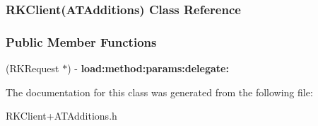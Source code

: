 \hypertarget{interface_r_k_client_07_a_t_additions_08}{
\subsubsection{RKClient(ATAdditions) Class Reference}
\label{interface_r_k_client_07_a_t_additions_08}
}
\subsubsection*{Public Member Functions}
\begin{DoxyCompactItemize}
\item 
\hypertarget{interface_r_k_client_07_a_t_additions_08_a7d50bf6b8829887d8e25b46049cae610}{
(RKRequest $\ast$) -\/ {\bfseries load:method:params:delegate:}}
\label{interface_r_k_client_07_a_t_additions_08_a7d50bf6b8829887d8e25b46049cae610}

\end{DoxyCompactItemize}


The documentation for this class was generated from the following file:\begin{DoxyCompactItemize}
\item 
RKClient+ATAdditions.h\end{DoxyCompactItemize}
